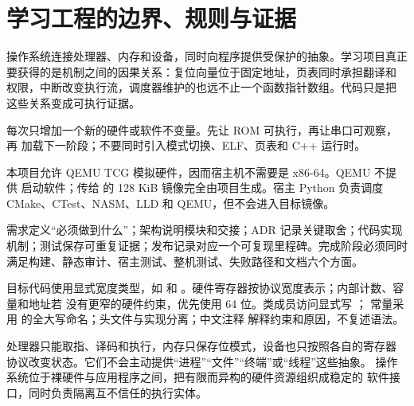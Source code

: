 \section{学习工程的边界、规则与证据}

操作系统连接处理器、内存和设备，同时向程序提供受保护的抽象。学习项目真正
要获得的是机制之间的因果关系：复位向量位于固定地址，页表同时承担翻译和
权限，中断改变执行流，调度器维护的也远不止一个函数指针数组。代码只是把
这些关系变成可执行证据。

每次只增加一个新的硬件或软件不变量。先让 ROM 可执行，再让串口可观察，再
加载下一阶段；不要同时引入模式切换、ELF、页表和 C++ 运行时。

本项目允许 QEMU TCG 模拟硬件，因而宿主机不需要是 x86-64。QEMU 不提供
启动软件；传给  的 128 KiB 镜像完全由项目生成。宿主 Python
负责调度 CMake、CTest、NASM、LLD 和 QEMU，但不会进入目标镜像。

\begin{center}
\end{center}

需求定义“必须做到什么”；架构说明模块和交接；ADR 记录关键取舍；代码实现
机制；测试保存可重复证据；发布记录对应一个可复现里程碑。完成阶段必须同时
满足构建、静态审计、宿主测试、整机测试、失败路径和文档六个方面。

目标代码使用显式宽度类型，如  和
。硬件寄存器按协议宽度表示；内部计数、容量和地址若
没有更窄的硬件约束，优先使用 64 位。类成员访问显式写 ；
常量采用  的全大写命名；头文件与实现分离；中文注释
解释约束和原因，不复述语法。

处理器只能取指、译码和执行，内存只保存位模式，设备也只按照各自的寄存器
协议改变状态。它们不会主动提供“进程”“文件”“终端”或“线程”这些抽象。
操作系统位于裸硬件与应用程序之间，把有限而异构的硬件资源组织成稳定的
软件接口，同时负责隔离互不信任的执行实体。


